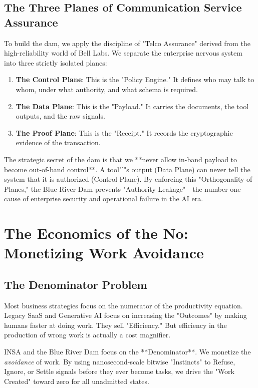 \documentclass[12pt,a4paper,oneside]{book}
\begin{document}
\section{The Three Planes of Communication Service Assurance}
To build the dam, we apply the discipline of "Telco Assurance" derived from the high-reliability world of Bell Labs. We separate the enterprise nervous system into three strictly isolated planes:
\begin{enumerate}
    \item \textbf{The Control Plane}: This is the "Policy Engine." It defines who may talk to whom, under what authority, and what schema is required.
    \item \textbf{The Data Plane}: This is the "Payload." It carries the documents, the tool outputs, and the raw signals.
    \item \textbf{The Proof Plane}: This is the "Receipt." It records the cryptographic evidence of the transaction.
\end{enumerate}

The strategic secret of the dam is that we **never allow in-band payload to become out-of-band control**. A tool"'"s output (Data Plane) can never tell the system that it is authorized (Control Plane). By enforcing this "Orthogonality of Planes," the Blue River Dam prevents "Authority Leakage"---the number one cause of enterprise security and operational failure in the AI era.

\chapter{The Economics of the No: Monetizing Work Avoidance}

\section{The Denominator Problem}
Most business strategies focus on the numerator of the productivity equation. Legacy SaaS and Generative AI focus on increasing the "Outcomes" by making humans faster at doing work. They sell "Efficiency." But efficiency in the production of wrong work is actually a cost magnifier. 

INSA and the Blue River Dam focus on the **Denominator**. We monetize the \textit{avoidance} of work. By using nanosecond-scale bitwise "Instincts" to Refuse, Ignore, or Settle signals before they ever become tasks, we drive the "Work Created" toward zero for all unadmitted states. 
\end{document}
